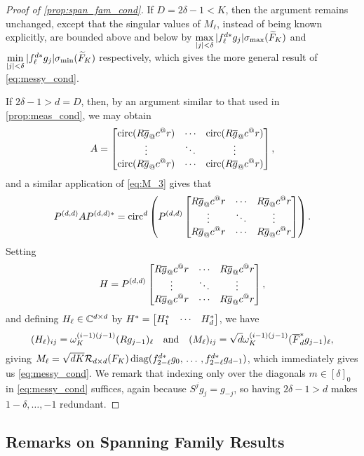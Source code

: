 \begin{proof}[Proof of \cref{prop:span_fam_cond}]
  If $D = 2 \delta - 1 < K$, then the argument remains unchanged, except that the singular values of $M_\ell$, instead of being known explicitly, are bounded above and below by $\max\limits_{|j| < \delta} |f_\ell^{d *} g_j| \sigma_{\max}(\widetilde{F}_K)$ and $\min\limits_{|j| < \delta} |f_\ell^{d *} g_j| \sigma_{\min}(\widetilde{F}_K)$ respectively, which gives the more general result of \eqref{eq:messy_cond}.

  If $2 \delta - 1 > d = D$, then, by an argument similar to that used in \cref{prop:meas_cond}, we may obtain \[A = \cornmatfun{\circop(R \conj{g}_@c^@r)}{1}{d}{0}{d - 1},\] and a similar application of \eqref{eq:M_3} gives that \[P^{(d, d)} A P^{(d, d)*} = \circop^d\left( P^{(d, d)} \cornmatfun{R \conj{g}_@c^@r}{1}{d}{0}{d - 1} \right).\]  Setting \[H = P^{(d, d)} \cornmatfun{R \conj{g}_@c^@r}{1}{d}{0}{d - 1},\] and defining $H_\ell \in \mathbb{C}^{d \times d}$ by $H^* = \begin{bmatrix} H^*_{1} & \cdots & H^*_{d} \end{bmatrix}$, %
  we have \[(H_\ell)_{ij} = \omega_K^{(i - 1)(j - 1)} (R g_{j - 1})_\ell \quad \text{and} \quad (M_\ell)_{ij} = \sqrt{d} \omega_K^{(i - 1)(j - 1)} (\overline{F}_d^* g_{j - 1})_\ell,\] giving $M_\ell = \sqrt{d K} \mathcal{R}_{d \times d}(F_K) \operatorname{diag}(f_{2 - \ell}^{d*} g_0,\, \ldots\, , f_{2 - \ell}^{d*} g_{d - 1})$, which immediately gives us \eqref{eq:messy_cond}.  We remark that indexing only over the diagonals $m \in [\delta]_0$ in \eqref{eq:messy_cond} suffices, again because $S^j g_j = g_{-j}$, so having $2 \delta - 1 > d$ makes $1 - \delta, \ldots, -1$ redundant.  
\end{proof}

%

\subsection{Remarks on Spanning Family Results}
\label{sec:span_fam_remarks}


